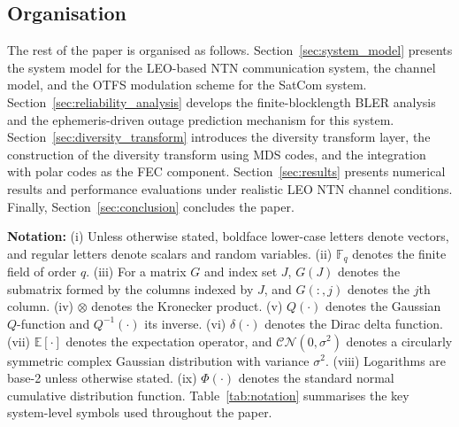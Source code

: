 \documentclass[journal]{IEEEtran}
\begin{document}
\subsection{Organisation}
\label{sec:organisation}
The rest of the paper is organised as follows.
Section~\ref{sec:system_model} presents the system model for the LEO-based
NTN communication system, the channel model, and the OTFS modulation scheme
for the SatCom system.
Section~\ref{sec:reliability_analysis} develops the finite-blocklength BLER
analysis and the ephemeris-driven outage prediction mechanism for this system.
Section~\ref{sec:diversity_transform} introduces the diversity transform
layer, the construction of the diversity transform using MDS codes, and the integration with polar codes as the FEC component.
Section~\ref{sec:results} presents numerical results and performance
evaluations under realistic LEO NTN channel conditions. Finally,
Section~\ref{sec:conclusion} concludes the paper.

\textbf{Notation:} (i) Unless otherwise stated, boldface lower-case 
letters denote vectors, and regular letters denote scalars and random 
variables. (ii) $\mathbb{F}_q$ denotes the finite field of order $q$. 
(iii) For a matrix $G$ and index set $J$, $G(J)$ denotes the submatrix 
formed by the columns indexed by $J$, and $G(:,j)$ denotes the $j$th 
column. (iv) $\otimes$ denotes the Kronecker product. (v) 
$Q(\cdot)$ denotes the Gaussian $Q$-function and $Q^{-1}(\cdot)$ its 
inverse. (vi)  $\delta(\cdot)$ denotes the Dirac delta function. 
(vii) $\mathbb{E}[\cdot]$ denotes the expectation operator, and 
$\mathcal{CN}(0,\sigma^2)$ denotes a circularly symmetric complex 
Gaussian distribution with variance $\sigma^2$. (viii) Logarithms
are base-2 unless otherwise stated. (ix) $\Phi(\cdot)$ denotes the standard normal cumulative distribution function. Table~\ref{tab:notation} summarises the key system-level symbols used throughout the paper.
\end{document}
